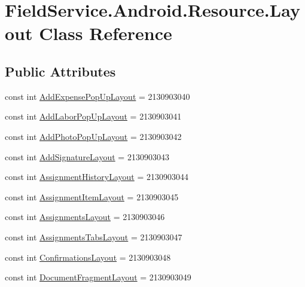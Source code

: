 \hypertarget{class_field_service_1_1_android_1_1_resource_1_1_layout}{\section{Field\+Service.\+Android.\+Resource.\+Layout Class Reference}
\label{class_field_service_1_1_android_1_1_resource_1_1_layout}
}
\subsection*{Public Attributes}
\begin{DoxyCompactItemize}
\item 
const int \hyperlink{class_field_service_1_1_android_1_1_resource_1_1_layout_a17631cd13938ee34adf8e733bc4c5ef8}{Add\+Expense\+Pop\+Up\+Layout} = 2130903040
\item 
const int \hyperlink{class_field_service_1_1_android_1_1_resource_1_1_layout_a81f229b7f8b7504874da42e9290bb2b4}{Add\+Labor\+Pop\+Up\+Layout} = 2130903041
\item 
const int \hyperlink{class_field_service_1_1_android_1_1_resource_1_1_layout_a5ee23337c70f3ecb37e15eefb4f01511}{Add\+Photo\+Pop\+Up\+Layout} = 2130903042
\item 
const int \hyperlink{class_field_service_1_1_android_1_1_resource_1_1_layout_a95ac6423af9b0d268a9bbeb469dcfe1f}{Add\+Signature\+Layout} = 2130903043
\item 
const int \hyperlink{class_field_service_1_1_android_1_1_resource_1_1_layout_a09d9b05d6d49f88f46ac348b0408e98a}{Assignment\+History\+Layout} = 2130903044
\item 
const int \hyperlink{class_field_service_1_1_android_1_1_resource_1_1_layout_a92ff42b6a17be5c3ae47db81f3ea121b}{Assignment\+Item\+Layout} = 2130903045
\item 
const int \hyperlink{class_field_service_1_1_android_1_1_resource_1_1_layout_a9128efe08a2a29508331250b598d03d6}{Assignments\+Layout} = 2130903046
\item 
const int \hyperlink{class_field_service_1_1_android_1_1_resource_1_1_layout_ae1cc1c7c40f7effa0efb20c714db7398}{Assignments\+Tabs\+Layout} = 2130903047
\item 
const int \hyperlink{class_field_service_1_1_android_1_1_resource_1_1_layout_a1920e436edbb92c2e063d957459b36ec}{Confirmations\+Layout} = 2130903048
\item 
const int \hyperlink{class_field_service_1_1_android_1_1_resource_1_1_layout_aa9435584714a00d2019621f3c2864db8}{Document\+Fragment\+Layout} = 2130903049

\end{DoxyCompactItemize}
